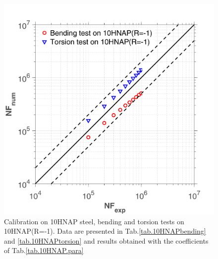 \begin{figure}[!h]
	\centering
	\includegraphics[width=\textwidth]{figures//10HNAP_bt1D_err.png} 
	\caption{Calibration on 10HNAP steel, bending and torsion tests on 10HNAP(R=-1). Data are presented in Tab.\ref{tab.10HNAPbending} and  \ref{tab.10HNAPtorsion} and results obtained with the coefficients of Tab.\ref{tab.10HNAP.para}}
	\label{fig.10HNAP1}
\end{figure}
